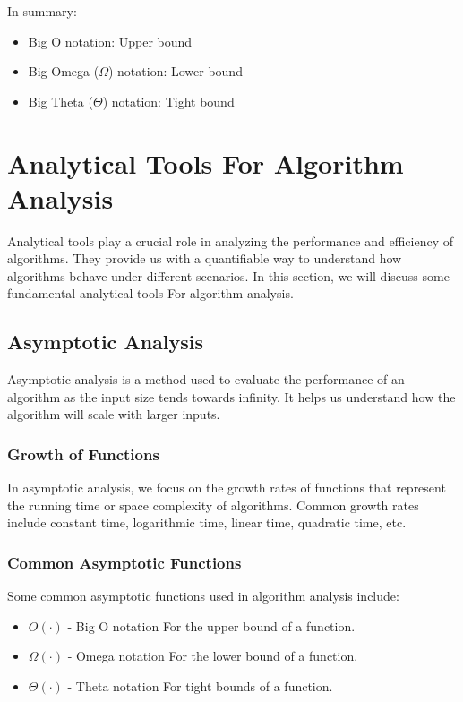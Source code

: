 \documentclass[12pt]{book} %
\begin{document}
In summary:
\begin{itemize}
    \item Big O notation: Upper bound
    \item Big Omega (\(\Omega\)) notation: Lower bound
    \item Big Theta (\(\Theta\)) notation: Tight bound
\end{itemize}

\section{Analytical Tools For Algorithm Analysis}

Analytical tools play a crucial role in analyzing the performance and efficiency of algorithms. They provide us with a quantifiable way to understand how algorithms behave under different scenarios. In this section, we will discuss some fundamental analytical tools For algorithm analysis.

\subsection{Asymptotic Analysis}

Asymptotic analysis is a method used to evaluate the performance of an algorithm as the input size tends towards infinity. It helps us understand how the algorithm will scale with larger inputs.

\subsubsection{Growth of Functions}

In asymptotic analysis, we focus on the growth rates of functions that represent the running time or space complexity of algorithms. Common growth rates include constant time, logarithmic time, linear time, quadratic time, etc.

\subsubsection{Common Asymptotic Functions}

Some common asymptotic functions used in algorithm analysis include:
\begin{itemize}
  \item $O(\cdot)$ - Big O notation For the upper bound of a function.
  \item $\Omega(\cdot)$ - Omega notation For the lower bound of a function.
  \item $\Theta(\cdot)$ - Theta notation For tight bounds of a function.
\end{itemize}
\end{document}
